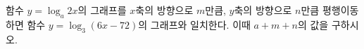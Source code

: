 함수 $y=\log_a 2x$의 그래프를 $x$축의 방향으로 $m$만큼, $y$축의 방향으로 $n$만큼 평행이동하면 함수 $y=\log_3 (6x-72)$의 그래프와 일치한다. 이때 $a+m+n$의 값을 구하시오. 
